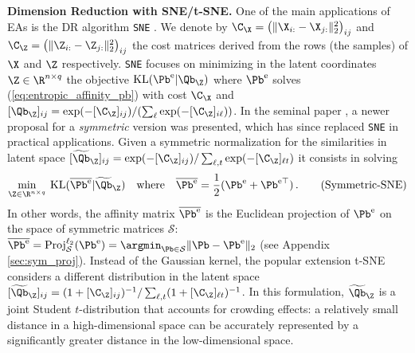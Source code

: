 \textbf{Dimension Reduction with SNE/t-SNE.} One of the main applications of EAs
is the DR algorithm \texttt{SNE} \cite{hinton2002stochastic}. We
denote by $\C_\X = \left(\|\X_{i:}-\X_{j:}\|_2^2\right)_{ij}$ and $\C_\Z =
\left(\|\Z_{i:}-\Z_{j:}\|_2^2\right)_{ij}$ the cost matrices derived from the
rows (\ie the samples) of $\X$ and $\Z$ respectively. \texttt{SNE} focuses on
minimizing in the latent coordinates $\Z \in \R^{n \times q}$ the objective
$\operatorname{KL}(\Pb^\mathrm{e} | \Qb_\Z)$ where $\Pb^\mathrm{e}$ solves
(\ref{eq:entropic_affinity_pb}) with cost $\C_\X$ and $[\Qb_\Z]_{ij} = \exp(-[\C_\Z]_{ij})/(\sum_{\ell}\exp(-[\C_\Z]_{i\ell}))$. In the seminal paper \citep{van2008visualizing}, a newer proposal for a \emph{symmetric} version was presented, which has since replaced \texttt{SNE} in practical applications. Given a symmetric
normalization for the similarities in latent space $[\widetilde{\Qb}_\Z]_{ij} = \exp(-[\C_\Z]_{ij})/\sum_{\ell,t}\exp(-[\C_\Z]_{\ell t})$ it consists in solving 
\begin{align}\label{symmetrization_tsne}
    \min_{\Z \in \R^{n \times q}} \: \operatorname{KL}(\overline{\Pb^{\mathrm{e}}} | \widetilde{\Qb}_\Z) \quad \text{where} \quad \overline{\Pb^{\mathrm{e}}} = \frac{1}{2}(\Pb^{\mathrm{e}} + \Pb^{\mathrm{e} \top}) \,.
\tag{Symmetric-SNE}
\end{align}
In other words, the affinity matrix $\overline{\Pb^{\mathrm{e}}}$ is the Euclidean projection of $\Pb^{\mathrm{e}}$ on the space of symmetric matrices $\mathcal{S}$: $\overline{\Pb^{\mathrm{e}}} = \operatorname{Proj}^{\ell_2}_{\mathcal{S}}(\Pb^{\mathrm{e}}) = \argmin_{\Pb \in \mathcal{S}}\| \Pb - \Pb^{\mathrm{e}} \|_2$ (see Appendix \ref{sec:sym_proj}). Instead of the Gaussian kernel, the popular extension t-SNE \citep{van2008visualizing} considers a different distribution in the latent space $[\widetilde{\Qb}_\Z]_{ij} = (1 + [\C_{\Z}]_{ij})^{-1}/\sum_{\ell,t}(1 +
[\C_{\Z}]_{\ell t})^{-1}$. In this formulation, $\widetilde{\Qb}_\Z$ is a joint
Student $t$-distribution that accounts for crowding effects: a relatively small
distance in a high-dimensional space can be accurately represented by a
significantly greater distance in the low-dimensional space.  

